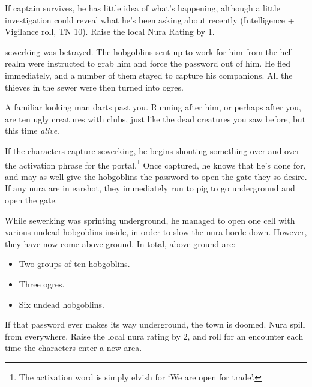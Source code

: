 \begin{multicols}{2}
If \gls{captain} survives, he has little idea of what's happening, although a little investigation could reveal what he's been asking about recently (Intelligence + Vigilance roll, TN 10).
Raise the local Nura Rating by 1.


\Gls{sewerking} was betrayed.  The hobgoblins sent up to work for him from the hell-realm were instructed to grab him and force the password out of him.  He fled immediately, and a number of them stayed to capture his companions.  All the thieves in the sewer were then turned into ogres.

\begin{speechtext}

	A familiar looking man darts past you.
	Running after him, or perhaps after you, are ten ugly creatures with clubs, just like the dead creatures you saw before, but this time \emph{alive}.

\end{speechtext}


\deephobgoblin

If the characters capture \gls{sewerking}, he begins shouting something over and over -- the activation phrase for the portal.\footnote{The activation word is simply elvish for `We are open for trade'.}  Once captured, he knows that he's done for, and may as well give the hobgoblins the password to open the gate they so desire.  If any nura are in earshot, they immediately run to \gls{pig} to go underground and open the gate.

While \gls{sewerking} was sprinting underground, he managed to open one cell with various undead hobgoblins inside, in order to slow the nura horde down.  However, they have now come above ground.  In total, above ground are:

\begin{itemize}

	\item{Two groups of ten hobgoblins.}
	\item{Three ogres.}
	\item{Six undead hobgoblins.}

\end{itemize}


\undeadhobgoblin

If that password ever makes its way underground, the town is doomed.
Nura spill from everywhere.
Raise the local nura rating by 2, and roll for an encounter each time the characters enter a new area.

\end{multicols}

